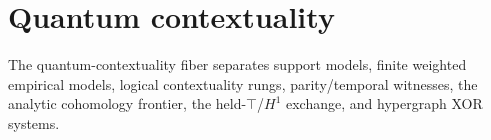 \section{Quantum contextuality}

The quantum-contextuality fiber separates support models, finite weighted
empirical models, logical contextuality rungs, parity/temporal witnesses,
the analytic cohomology frontier, the held-\(\top\)/\(H^1\) exchange, and
hypergraph XOR systems.









